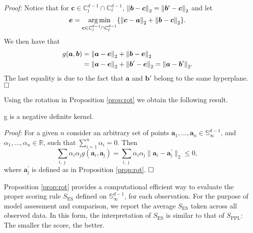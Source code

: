 {\em Proof:}
Notice that for 
  $\bm{c} \in {\mathbb C}_{\jmath}^{d-1}\cap{\mathbb C}_{\ell}^{d-1}$,
     $\pnorm{\bm{b} - \bm{c}}{2} =  \pnorm{\bm{b}^{\prime} - \bm{c}}{2}$ and let
\[\bm{e} = 
    \argmin_{\bm{c} \in{\mathbb C}_{\jmath}^{d-1}\cap{\mathbb C}_{\ell}^{d-1}}\left\{ 
        \pnorm{\bm{c}-\bm{a}}{2} + \pnorm{\bm{b}-\bm{c}}{2} \right\}.
\]
We then have that
  \begin{equation*}
    \begin{aligned}
    g(\bm{a}, \bm{b}) &= \pnorm{\bm{a} - \bm{e}}{2} + \pnorm{\bm{b} - \bm{e}}{2}\\
    &= \pnorm{\bm{a} - \bm{e}}{2} + \pnorm{\bm{b}^{\prime} 
        - \bm{e}}{2} = \pnorm{\bm{a} - \bm{b}^{\prime}}{2}.
    \end{aligned}
  \end{equation*}
  The last equality is due to the fact that $\bm{a}$ and $\bm{b}'$ belong to the 
  same hyperplane. $\hfill\Box$
    
Using the rotation in Proposition \ref{prop:rot} we obtain the following result.
    \begin{prop}\label{prop:g}
    g is a negative definite kernel.
    \end{prop}
    {\em Proof:} For a given $n$ consider an arbitrary set of points
    $\bm{a}_1, \ldots , \bm{a}_n \in {\mathbb S}_\infty^{d-1}$, and 
    $\alpha_1, \ldots , \alpha_n \in {\mathbb R}$, such that $\sum_{i=1}^n
    \alpha _i = 0$. Then
    \[
    \sum_{i,\jmath} \alpha_i \alpha_\jmath g(\bm{a}_i, \bm{a}_\jmath) 
        = \sum_{i,\jmath} \alpha_i \alpha_\jmath 
    \|\bm{a}_i - \bm{a}_\jmath^\prime\|_2 \leq 0,
    \]
    where $\bm{a}_\jmath^\prime$ is defined as in Proposition \ref{prop:rot}. $\hfill\Box$

Proposition \ref{prop:rot} provides a computational efficient way to evaluate the proper
    scoring rule $S_{\text{ES}}$ defined on ${\mathbb S}_\infty^{d-1}$, for each 
    observation. For the purpose of model assessment and comparison, we report the 
    average $S_{\text{ES}}$ taken across all observed data.  In this form, the 
    interpretation of $S_{\text{ES}}$ is similar to that of $S_{\text{PPL}}$: The smaller 
    the score, the better.
    
